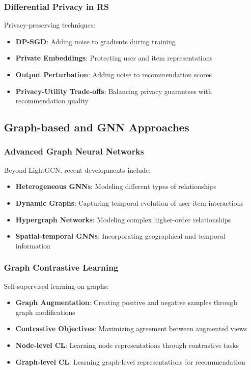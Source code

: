 \subsubsection{Differential Privacy in RS}

Privacy-preserving techniques:
\begin{itemize}
    \item \textbf{DP-SGD}: Adding noise to gradients during training
    \item \textbf{Private Embeddings}: Protecting user and item representations
    \item \textbf{Output Perturbation}: Adding noise to recommendation scores
    \item \textbf{Privacy-Utility Trade-offs}: Balancing privacy guarantees with recommendation quality
\end{itemize}

\subsection{Graph-based and GNN Approaches}

\subsubsection{Advanced Graph Neural Networks}

Beyond LightGCN, recent developments include:
\begin{itemize}
    \item \textbf{Heterogeneous GNNs}: Modeling different types of relationships
    \item \textbf{Dynamic Graphs}: Capturing temporal evolution of user-item interactions
    \item \textbf{Hypergraph Networks}: Modeling complex higher-order relationships
    \item \textbf{Spatial-temporal GNNs}: Incorporating geographical and temporal information
\end{itemize}

\subsubsection{Graph Contrastive Learning}

Self-supervised learning on graphs:
\begin{itemize}
    \item \textbf{Graph Augmentation}: Creating positive and negative samples through graph modifications
    \item \textbf{Contrastive Objectives}: Maximizing agreement between augmented views
    \item \textbf{Node-level CL}: Learning node representations through contrastive tasks
    \item \textbf{Graph-level CL}: Learning graph-level representations for recommendation
\end{itemize}

